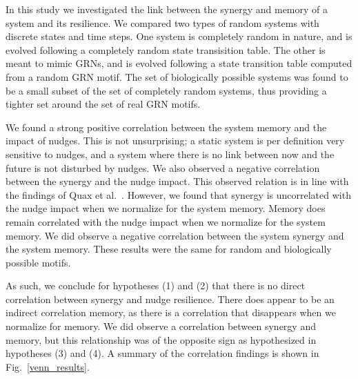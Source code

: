 \documentclass[../main.tex]{subfiles}
\begin{document}

In this study we investigated the link between the synergy and memory of a system and its resilience.
We compared two types of random systems with discrete states and time steps.
One system is completely random in nature, and is evolved following a completely random state transisition table.
The other is meant to mimic GRNs, and is evolved following a state transition table computed from a random GRN motif.
The set of biologically possible systems was found to be a small subset of the set of completely random systems, thus providing a tighter set around the set of real GRN motifs.

We found a strong positive correlation between the system memory and the impact of nudges.
This is not unsurprising; a static system is per definition very sensitive to nudges, and a system where there is no link between now and the future is not disturbed by nudges.
We also observed a negative correlation between the synergy and the nudge impact.
This observed relation is in line with the findings of Quax et al.~\cite{quax2017quantifying}.
However, we found that synergy is uncorrelated with the nudge impact when we normalize for the system memory.
Memory does remain correlated with the nudge impact when we normalize for the system memory.
We did observe a negative correlation between the system synergy and the system memory.
These results were the same for random and biologically possible motifs.

As such, we conclude for hypotheses (1) and (2) that there is no direct correlation between synergy and nudge resilience.
There does appear to be an indirect correlation memory, as there is a correlation that disappears when we normalize for memory.
We did observe a correlation between synergy and memory, but this relationship was of the opposite sign as hypothesized in hypotheses (3) and (4).
A summary of the correlation findings is shown in Fig.~\ref{venn_results}.
\end{document}
